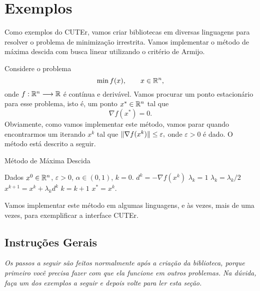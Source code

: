 \section{Exemplos}
Como exemplos do CUTEr, vamos criar bibliotecas em diversas linguagens para resolver o 
problema de minimização irrestrita. 
Vamos implementar o método de máxima descida com busca linear utilizando o
critério de Armijo.

Considere o problema
\begin{equation*}
 \min f(x), \qquad x \in \mathbb{R}^{n},
\end{equation*}
onde $f:\mathbb{R}^{n}\longrightarrow\mathbb{R}$ é contínua e derivável. Vamos procurar um ponto estacionário para esse
problema, isto é, um ponto $x^* \in \mathbb{R}^{n}$ tal que $$\nabla f(x^*) = 0.$$
Obviamente, como vamos implementar este método, vamos parar quando encontrarmos um
iterando $x^k$ tal que $\Vert \nabla f(x^k)\Vert \leq \varepsilon,$ onde $\varepsilon > 0$ é
dado. O método está descrito a seguir.
\begin{algorithm}[H]
\caption{Método de Máxima Descida}
 \begin{algorithmic}[1]
 \State Dados $x^0 \in \mathbb{R}^{n}$, $\varepsilon > 0$, $\alpha \in (0,1)$, $k = 0$.
  \State $d^k = -\nabla f(x^k)$
  \State $\lambda_k = 1$
   \State $\lambda_k = \lambda_k/2$
  \EndWhile
  \State $x^{k+1} = x^k + \lambda_kd^k$
  \State $k = k + 1$
 \EndWhile
 \State $x^* = x^k$.
 \end{algorithmic}
\end{algorithm}
Vamos implementar este método em algumas linguagens, e às vezes, mais de uma vezes, para
exemplificar a interface CUTEr.

\subsection{Instruções Gerais}

\emph{
Os passos a seguir são feitos normalmente após a criação da biblioteca, porque
primeiro você precisa fazer com que ela funcione em outros problemas. Na dúvida,
faça um dos exemplos a seguir e depois volte para ler esta seção.}


